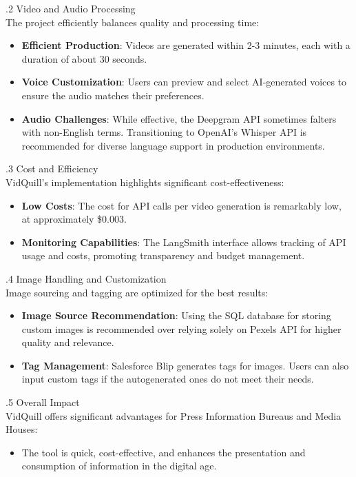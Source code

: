 \documentclass[12pt]{article}
\begin{document}
.2 Video and Audio Processing\\

The project efficiently balances quality and processing time:
\begin{itemize}
  \item \textbf{Efficient Production}: Videos are generated within 2-3 minutes, each with a duration of about 30 seconds.
  \item \textbf{Voice Customization}: Users can preview and select AI-generated voices to ensure the audio matches their preferences.
  \item \textbf{Audio Challenges}: While effective, the Deepgram API sometimes falters with non-English terms. Transitioning to OpenAI's Whisper API is recommended for diverse language support in production environments.
\end{itemize}

.3 Cost and Efficiency\\

VidQuill's implementation highlights significant cost-effectiveness:
\begin{itemize}
  \item \textbf{Low Costs}: The cost for API calls per video generation is remarkably low, at approximately \$0.003.
  \item \textbf{Monitoring Capabilities}: The LangSmith interface allows tracking of API usage and costs, promoting transparency and budget management.
\end{itemize}

.4 Image Handling and Customization\\

Image sourcing and tagging are optimized for the best results:
\begin{itemize}
  \item \textbf{Image Source Recommendation}: Using the SQL database for storing custom images is recommended over relying solely on Pexels API for higher quality and relevance.
  \item \textbf{Tag Management}: Salesforce Blip generates tags for images. Users can also input custom tags if the autogenerated ones do not meet their needs.
\end{itemize}

.5 Overall Impact\\

VidQuill offers significant advantages for Press Information Bureaus and Media Houses:
\begin{itemize}
  \item The tool is quick, cost-effective, and enhances the presentation and consumption of information in the digital age.
\end{itemize}
\end{document}
